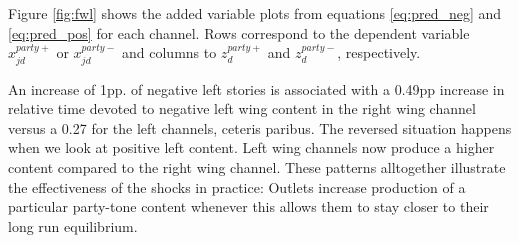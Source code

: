\documentclass[12pt]{article}
\begin{document}

	
	
	Figure \ref{fig:fwl} shows the added variable plots from equations  \ref{eq:pred_neg} and \ref{eq:pred_pos} for each channel.  Rows correspond to the dependent variable $x_{jd}^{party+}$  or $x_{jd}^{party-}$  and columns to  $z_{d}^{party+}$  and  $z_{d}^{party-}$, respectively.  
	
	
	 An increase of 1pp. of negative left stories is associated with a 0.49pp increase in relative time devoted to negative left wing content in the right wing channel versus a 0.27 for the left channels, ceteris paribus. The reversed situation happens when we look at positive left content. Left wing channels now produce a higher content compared to the right wing channel. These patterns alltogether illustrate the effectiveness of the shocks in practice: Outlets increase production of a particular party-tone content whenever this allows them to stay closer to their long run equilibrium.
	
	
	
\end{document}
